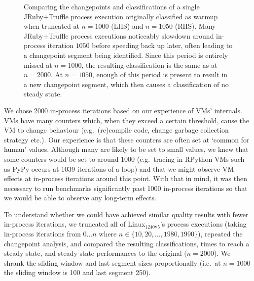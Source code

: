 \documentclass[acmsmall,screen]{acmart}
\newcommand{\bencherseven}{Linux$_\mathrm{1240v5}$\xspace}
\newcommand{\numiterations}{2000\xspace}
\begin{document}
\begin{figure}[!tbp]
\begin{minipage}[t]{0.485\textwidth}
\end{minipage}
\caption{Comparing the changepoints and classifications of a
single JRuby+Truffle process execution originally classified as warmup when
truncated at $n=1000$ (LHS) and $n=1050$ (RHS). Many JRuby+Truffle process
executions noticeably slowdown around in-process iteration $1050$ before
speeding back up later, often leading to a changepoint segment
being identified. Since this period is entirely missed at $n=1000$,
the resulting classification is the same as at $n=2000$. At $n=1050$,
enough of this period is present to result in a new changepoint
segment, which then causes a classification of no steady state.}
\label{fig:truncated}
\end{figure}

We chose \numiterations in-process iterations based on our experience of VMs' internals.
VMs have many counters which, when they exceed a certain threshold, cause the VM
to change behaviour (e.g.~(re)compile code, change garbage collection strategy
etc.). Our experience is that these counters are often set at `common for human'
values. Although many are likely to be set to small values, we knew that some
counters would be set to around 1000 (e.g.~tracing in RPython VMs such
as PyPy occurs at 1039 iterations of a loop) and that we might observe VM effects at in-process iterations
around this point. With that in mind, it was then necessary to
run benchmarks significantly past 1000 in-process iterations so that we would
be able to observe any long-term effects.

To understand whether we could have achieved similar quality results with fewer in-process
iterations, we truncated all of \bencherseven's process executions (taking
in-process iterations from $0 \ldots n$ where $n \in \{10, 20, \ldots, 1980, 1990\}$),
repeated the changepoint analysis, and compared the resulting
classifications, times to reach a steady state, and steady state performances to
the original ($n=2000$). We shrank the sliding window and last segment sizes
proportionally (i.e.~at $n=1000$ the sliding window is 100 and last segment
250).
\end{document}
